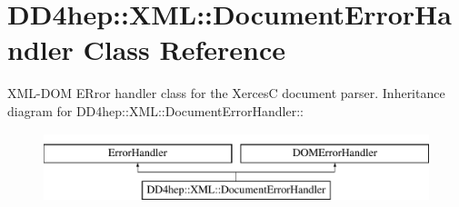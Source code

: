 \hypertarget{class_d_d4hep_1_1_x_m_l_1_1_document_error_handler}{
\section{DD4hep::XML::DocumentErrorHandler Class Reference}
\label{class_d_d4hep_1_1_x_m_l_1_1_document_error_handler}
}


XML-\/DOM ERror handler class for the XercesC document parser.  
Inheritance diagram for DD4hep::XML::DocumentErrorHandler::\begin{figure}[H]
\begin{center}
\leavevmode
\includegraphics[height=2cm]{class_d_d4hep_1_1_x_m_l_1_1_document_error_handler}
\end{center}
\end{figure}
